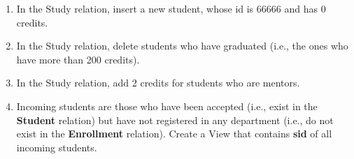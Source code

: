 \documentclass[paper=a4, fontsize=11pt]{scrartcl}
\numberwithin{equation}{section}		%
\numberwithin{figure}{section}			%
\numberwithin{table}{section}				%
\begin{document}
	\begin{enumerate}
	
		\item In the Study relation, insert a new student, whose id is 66666 and has 0 credits.\\

		\item In the Study relation, delete students who have graduated (i.e., the ones who have more than 200 credits).\\
		
		\item In the Study relation, add 2 credits for students who are mentors.\\
		
		\item Incoming students are those who have been accepted (i.e., exist in the \textbf{Student} relation) but have not registered in any department (i.e., do not exist in the \textbf{Enrollment} relation). Create a View that contains \textbf{sid} of all incoming students.\\
		
	\end{enumerate}
	
	
\end{document}
